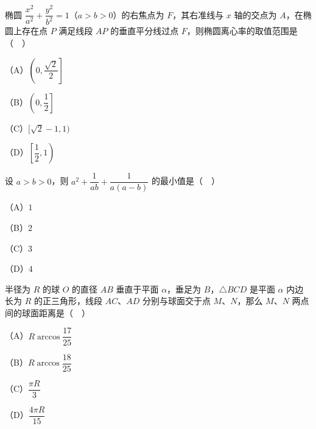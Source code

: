 \endgroup
\begin{question}
椭圆 $\dfrac{x^2}{a^2}+\dfrac{y^2}{b^2}=1$（$a>b>0$）的右焦点为 $F$，其右准线与 $x$ 轴的交点为 $A$，在椭圆上存在点 $P$ 满足线段 $AP$ 的垂直平分线过点 $F$，则椭圆离心率的取值范围是（　）

（A）$\left(0,\dfrac{\sqrt2}2\right]$

（B）$\left(0,\dfrac12\right]$

（C）$[\sqrt2-1,1)$

（D）$\left[\dfrac12,1\right)$

\end{question}
\begin{question}
设 $a>b>0$，则 $a^2+\dfrac1{ab}+\dfrac1{a(a-b)}$ 的最小值是（　）

（A）$1$

（B）$2$

（C）$3$

（D）$4$

\end{question}
\begin{question}
半径为 $R$ 的球 $O$ 的直径 $AB$ 垂直于平面 $\alpha$，垂足为 $B$，$\triangle BCD$ 是平面 $\alpha$ 内边长为 $R$ 的正三角形，线段 $AC$、$AD$ 分别与球面交于点 $M$、$N$，那么 $M$、$N$ 两点间的球面距离是（　）

（A）$R\arccos\dfrac{17}{25}$

（B）$R\arccos\dfrac{18}{25}$

（C）$\dfrac{\pi R}3$

（D）$\dfrac{4\pi R}{15}$

\end{question}

